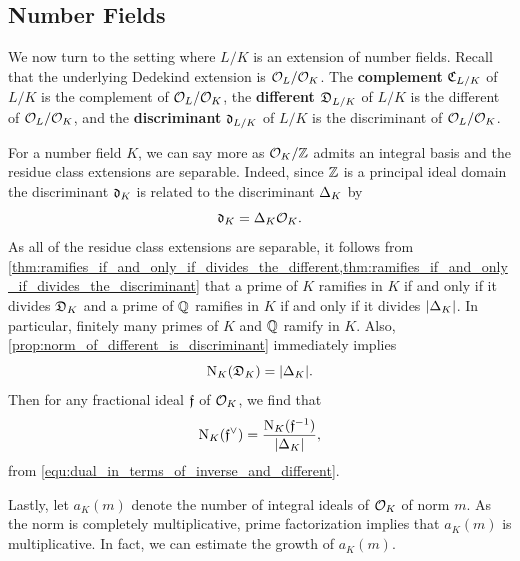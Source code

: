     \subsection*{Number Fields}
      We now turn to the setting where \(L/K\) is an extension of number fields. Recall that the underlying Dedekind extension is \(\mathcal{O}_{L}/\mathcal{O}_{K}\). The \textbf{complement} \(\mathfrak{C}_{L/K}\) of \(L/K\) is the complement of \(\mathcal{O}_{L}/\mathcal{O}_{K}\), the \textbf{different} \(\mathfrak{D}_{L/K}\) of \(L/K\) is the different of \(\mathcal{O}_{L}/\mathcal{O}_{K}\), and the \textbf{discriminant} \(\mathfrak{d}_{L/K}\) of \(L/K\) is the discriminant of \(\mathcal{O}_{L}/\mathcal{O}_{K}\).
      
      For a number field \(K\), we can say more as \(\mathcal{O}_{K}/\mathbb{Z}\) admits an integral basis and the residue class extensions are separable. Indeed, since \(\mathbb{Z}\) is a principal ideal domain the discriminant \(\mathfrak{d}_{K}\) is related to the discriminant \(\Delta_{K}\) by
      \[
        \mathfrak{d}_{K} = \Delta_{K}\mathcal{O}_{K}.
      \]
      As all of the residue class extensions are separable, it follows from \cref{thm:ramifies_if_and_only_if_divides_the_different,thm:ramifies_if_and_only_if_divides_the_discriminant} that a prime of \(K\) ramifies in \(K\) if and only if it divides \(\mathfrak{D}_{K}\) and a prime of \(\mathbb{Q}\) ramifies in \(K\) if and only if it divides \(|\Delta_{K}|\). In particular, finitely many primes of \(K\) and \(\mathbb{Q}\) ramify in \(K\). Also, \cref{prop:norm_of_different_is_discriminant} immediately implies 
      \[
        \operatorname{\mathrm{N}}_{K}(\mathfrak{D}_{K}) = |\Delta_{K}|.
      \]
      Then for any fractional ideal \(\mathfrak{f}\) of \(\mathcal{O}_{K}\), we find that
      \[
        \operatorname{\mathrm{N}}_{K}(\mathfrak{f}^{\vee}) = \frac{\operatorname{\mathrm{N}}_{K}(\mathfrak{f}^{-1})}{|\Delta_{K}|},
      \]
      from \cref{equ:dual_in_terms_of_inverse_and_different}.
      
      Lastly, let \(a_{K}(m)\) denote the number of integral ideals of \(\mathcal{O}_{K}\) of norm \(m\). As the norm is completely multiplicative, prime factorization implies that \(a_{K}(m)\) is multiplicative. In fact, we can estimate the growth of \(a_{K}(m)\).


